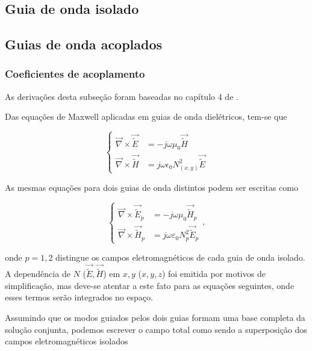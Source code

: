 \documentclass[final,12pt,times,twocolumn,authoryear]{elsarticle}
\newcommand{\diverg}{\vec{\nabla}}
\newcommand{\tildee}{ \vec{\tilde{E}}}
\newcommand{\tildeh}{ \vec{\tilde{H}}}
\newcommand{\epsz}{\varepsilon_0}
\newcommand{\muz}{\mu_0}
\begin{document}
\subsection{Guia de onda isolado}
\label{subsec:rectangle_solo}

\subsection{Guias de onda acoplados}
\label{subsec:rectangle_coupled}

\subsubsection{Coeficientes de acoplamento}
\label{subsec:coupling_coeff}

As derivações desta subseção foram baseadas no capítulo 4 de \cite{okamoto2021fundamentals}.

Das equações de Maxwell aplicadas em guias de onda dielétricos, tem-se que

\begin{equation}\label{eq:maxwell_guides}
\left\{
\begin{split}
\diverg \times \tildee &= -j\omega\mu_0\tildeh \\
\diverg\times \tildeh &= j\omega\epsilon_0N_{(x,y)}^2\tildee
\end{split}\right.
\end{equation}

As mesmas equações para dois guias de onda distintos podem ser escritas como

\begin{equation}\label{eq:maxwell_pguides}
\left\{
\begin{split}
\diverg \times \tildee_p &= -j\omega\muz\tildeh_p \\
\diverg\times \tildeh_p &= j\omega\epsz N_p^2\tildee_p
\end{split}\right. ,
\end{equation}

\noindent onde $p=1,2$ distingue os campos eletromagnéticos de cada guia de onda isolado. A dependência de $N$ ($\tildee,\tildeh$) em $x,y$ ($x,y,z$) foi emitida por motivos de simplificação, mas deve-se atentar a este fato para as equações seguintes, onde esses termos serão integrados no espaço.

Assumindo que os modos guiados pelos dois guias formam uma base completa da solução conjunta, podemos escrever o campo total como sendo a superposição dos campos eletromagnéticos isolados
\end{document}
